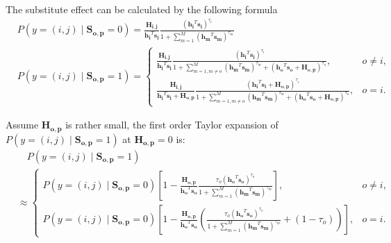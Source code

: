 \documentclass[12pt]{article}
\theoremstyle{definition}
\newcommand{\matr}[1]{\mathbf{#1}} %
\begin{document}
\begin{sloppypar}
The substitute effect can be calculated by the following formula 
\begin{align*}
    &P(y=(i,j) \mid \matr{S_{o,p}}=0) =  \frac{\matr{H_{i,j}}}
    {\matr{h_i}^T \matr{s_i}} \frac{(\matr{h_i}^T \matr{s_i})^{\tau_i}}{1+\sum_{m=1}^{M} (\matr{h_m}^T\matr{s_m})^{\tau_m}}\\
    &P(y=(i,j) \mid \matr{S_{o,p}} = 1)=
    \begin{cases}
        \frac{\matr{H_{i,j}}}
        {\matr{h_i}^T \matr{s_i}} \frac{(\matr{h_i}^T \matr{s_i})^{\tau_i}}{1+\sum
        \limits_{m=1, m \neq o}^{M} (\matr{h_m}^T\matr{s_m})^{\tau_m}+(\matr{h_o}^T \matr{s_o}+\matr{H_{o,p}})^{\tau_o}}, &o \neq i,\\
        \frac{\matr{H_{i,j}}}
        {\matr{h_i}^T \matr{s_i}+\matr{H_{o,p}}} \frac{(\matr{h_i}^T \matr{s_i}+\matr{H_{o,p}})^{\tau_i}}{1+\sum\limits_{m=1, m \neq o}^{M} (\matr{h_m}^T\matr{s_m})^{\tau_m}+(\matr{h_o}^T \matr{s_o}+\matr{H_{o,p}})^{\tau_o}}, &o = i.
    \end{cases}
\end{align*}

Assume $\matr{H_{o,p}}$ is rather small, the first order Taylor expansion of\\ $P(y=(i,j) \mid \matr{S_{o,p}} = 1)$ at $\matr{H_{o,p}}=0$ is:
\begin{align}\label{p proun}
    &\quad P(y=(i,j) \mid \matr{S_{o,p}} = 1) \nonumber\\
    &\approx
    \begin{cases}
        P(y=(i,j) \mid \matr{S_{o,p}} = 0)[1-\frac{\matr{H_{o,p}}}{\matr{h_o}^T \matr{s_o}}\frac{\tau_o(\matr{h_o}^T \matr{s_o})^{\tau_o}}{1+\sum_{m=1}^{M} (\matr{h_m}^T\matr{s_m})^{\tau_m}}], &o \neq i,\\
        P(y=(i,j) \mid \matr{S_{o,p}} = 0)[1-\frac{\matr{H_{o,p}}}{\matr{h_o}^T \matr{s_o}}(\frac{\tau_o(\matr{h_o}^T\matr{s_o})^{\tau_o}}{1+\sum_{m=1}^{M} (\matr{h_m}^T\matr{s_m})^{\tau_m}}+(1-\tau_o))], &o = i.
    \end{cases}
\end{align}


\end{sloppypar}
\end{document}
